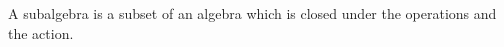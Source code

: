\begin{definition}[Subalgebra]
    A subalgebra is a subset of an algebra which is closed under the operations and the action.
\end{definition}
